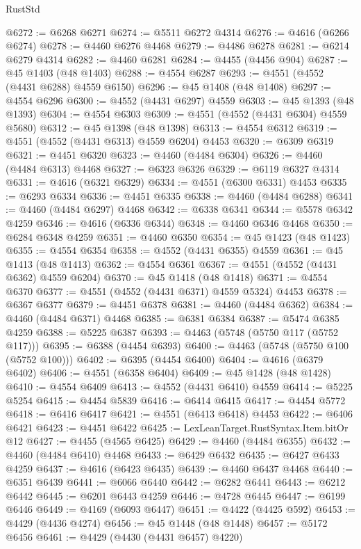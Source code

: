 \begin{lexlean}{RustStd}
\begin{coremodule}
@6272 := @6268 @6271
@6274 := @5511 @6272 @4314
@6276 := @4616 (@6266 @6274)
@6278 := @4460 @6276 @4468
@6279 := @4486 @6278
@6281 := @6214 @6279 @4314
@6282 := @4460 @6281
@6284 := @4455 (@4456 @904)
@6287 := @45 @1403 (@48 @1403)
@6288 := @4554 @6287
@6293 := @4551 (@4552 (@4431 @6288) @4559 @6150)
@6296 := @45 @1408 (@48 @1408)
@6297 := @4554 @6296
@6300 := @4552 (@4431 @6297) @4559
@6303 := @45 @1393 (@48 @1393)
@6304 := @4554 @6303
@6309 := @4551 (@4552 (@4431 @6304) @4559 @5680)
@6312 := @45 @1398 (@48 @1398)
@6313 := @4554 @6312
@6319 := @4551 (@4552 (@4431 @6313) @4559 @6204) @4453
@6320 := @6309 @6319
@6321 := @4451 @6320
@6323 := @4460 (@4484 @6304)
@6326 := @4460 (@4484 @6313) @4468
@6327 := @6323 @6326
@6329 := @6119 @6327 @4314
@6331 := @4616 (@6321 @6329)
@6334 := @4551 (@6300 @6331) @4453
@6335 := @6293 @6334
@6336 := @4451 @6335
@6338 := @4460 (@4484 @6288)
@6341 := @4460 (@4484 @6297) @4468
@6342 := @6338 @6341
@6344 := @5578 @6342 @4259
@6346 := @4616 (@6336 @6344)
@6348 := @4460 @6346 @4468
@6350 := @6284 @6348 @4259
@6351 := @4460 @6350
@6354 := @45 @1423 (@48 @1423)
@6355 := @4554 @6354
@6358 := @4552 (@4431 @6355) @4559
@6361 := @45 @1413 (@48 @1413)
@6362 := @4554 @6361
@6367 := @4551 (@4552 (@4431 @6362) @4559 @6204)
@6370 := @45 @1418 (@48 @1418)
@6371 := @4554 @6370
@6377 := @4551 (@4552 (@4431 @6371) @4559 @5324) @4453
@6378 := @6367 @6377
@6379 := @4451 @6378
@6381 := @4460 (@4484 @6362)
@6384 := @4460 (@4484 @6371) @4468
@6385 := @6381 @6384
@6387 := @5474 @6385 @4259
@6388 := @5225 @6387
@6393 := @4463 (@5748 (@5750 @117 (@5752 @117)))
@6395 := @6388 (@4454 @6393)
@6400 := @4463 (@5748 (@5750 @100 (@5752 @100)))
@6402 := @6395 (@4454 @6400)
@6404 := @4616 (@6379 @6402)
@6406 := @4551 (@6358 @6404)
@6409 := @45 @1428 (@48 @1428)
@6410 := @4554 @6409
@6413 := @4552 (@4431 @6410) @4559
@6414 := @5225 @5254
@6415 := @4454 @5839
@6416 := @6414 @6415
@6417 := @4454 @5772
@6418 := @6416 @6417
@6421 := @4551 (@6413 @6418) @4453
@6422 := @6406 @6421
@6423 := @4451 @6422
@6425 := LexLeanTarget.RustSyntax.Item.bitOr @12
@6427 := @4455 (@4565 @6425)
@6429 := @4460 (@4484 @6355)
@6432 := @4460 (@4484 @6410) @4468
@6433 := @6429 @6432
@6435 := @6427 @6433 @4259
@6437 := @4616 (@6423 @6435)
@6439 := @4460 @6437 @4468
@6440 := @6351 @6439
@6441 := @6066 @6440
@6442 := @6282 @6441
@6443 := @6212 @6442
@6445 := @6201 @6443 @4259
@6446 := @4728 @6445
@6447 := @6199 @6446
@6449 := @4169 (@6093 @6447)
@6451 := @4422 (@4425 @592)
@6453 := @4429 (@4436 @4274)
@6456 := @45 @1448 (@48 @1448)
@6457 := @5172 @6456
@6461 := @4429 (@4430 (@4431 @6457) @4220)

\end{coremodule}
\end{lexlean}
